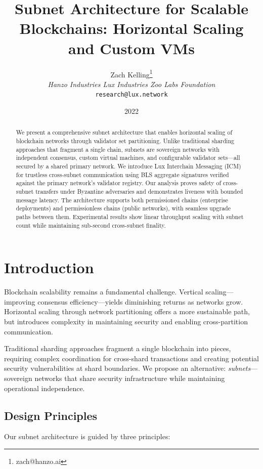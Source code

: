 \documentclass[11pt,a4paper]{article}
\title{Subnet Architecture for Scalable Blockchains: Horizontal Scaling and Custom VMs}
\author{Zach Kelling\thanks{zach@hanzo.ai} \\ \textit{Hanzo Industries \quad Lux Industries \quad Zoo Labs Foundation} \\ \texttt{research@lux.network}}
\date{2022}
\begin{document}
\maketitle

\begin{abstract}
We present a comprehensive subnet architecture that enables horizontal scaling of blockchain networks through validator set partitioning. Unlike traditional sharding approaches that fragment a single chain, subnets are sovereign networks with independent consensus, custom virtual machines, and configurable validator sets---all secured by a shared primary network. We introduce Lux Interchain Messaging (ICM) for trustless cross-subnet communication using BLS aggregate signatures verified against the primary network's validator registry. Our analysis proves safety of cross-subnet transfers under Byzantine adversaries and demonstrates liveness with bounded message latency. The architecture supports both permissioned chains (enterprise deployments) and permissionless chains (public networks), with seamless upgrade paths between them. Experimental results show linear throughput scaling with subnet count while maintaining sub-second cross-subnet finality.
\end{abstract}

\section{Introduction}

Blockchain scalability remains a fundamental challenge. Vertical scaling---improving consensus efficiency---yields diminishing returns as networks grow. Horizontal scaling through network partitioning offers a more sustainable path, but introduces complexity in maintaining security and enabling cross-partition communication.

Traditional sharding approaches fragment a single blockchain into pieces, requiring complex coordination for cross-shard transactions and creating potential security vulnerabilities at shard boundaries. We propose an alternative: \emph{subnets}---sovereign networks that share security infrastructure while maintaining operational independence.

\subsection{Design Principles}

Our subnet architecture is guided by three principles:
\end{document}
